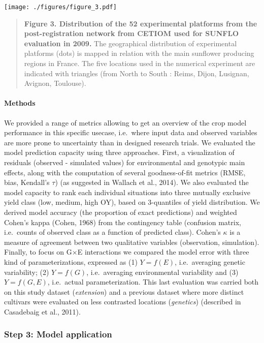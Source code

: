 \documentclass[a4paper]{article}
\let\oldparagraph\paragraph
\renewcommand{\paragraph}[1]{\oldparagraph{#1}\mbox{}}
\begin{document}
\texttt{[image: ./figures/figure\_3.pdf]}

\begin{quote}
\textbf{Figure 3. Distribution of the 52 experimental platforms from the
post-registration network from CETIOM used for SUNFLO evaluation in
2009.} The geographical distribution of experimental platforms (dots) is
mapped in relation with the main sunflower producing regions in France.
The five locations used in the numerical experiment are indicated with
triangles (from North to South : Reims, Dijon, Lusignan, Avignon,
Toulouse).
\end{quote}

\paragraph{Methods}\label{methods}

We provided a range of metrics allowing to get an overview of the crop
model performance in this specific usecase, i.e.~where input data and
observed variables are more prone to uncertainty than in designed
research trials. We evaluated the model prediction capacity using three
approaches. First, a visualization of residuals (observed - simulated
values) for environmental and genotypic main effects, along with the
computation of several goodness-of-fit metrics (RMSE, bias, Kendall's
\(\tau\)) (as suggested in Wallach et al., 2014). We also evaluated the
model capacity to rank each individual situations into three mutually
exclusive yield class (low, medium, high OY), based on 3-quantiles of
yield distribution. We derived model accuracy (the proportion of exact
predictions) and weighted Cohen's kappa (Cohen, 1968) from the
contingency table (confusion matrix, i.e.~counts of observed class as a
function of predicted class). Cohen's \(\kappa\) is a measure of
agreement between two qualitative variables (observation, simulation).
Finally, to focus on G\(\times\)E interactions we compared the model
error with three kind of parameterizations, expressed as (1)
\(Y = f(E)\), i.e.~averaging genetic variability; (2) \(Y = f(G)\),
i.e.~averaging environmental variability and (3) \(Y = f(G, E)\),
i.e.~actual parameterization. This last evaluation was carried both on
this study dataset (\emph{extension}) and a previous dataset where more
distinct cultivars were evaluated on less contrasted locations
(\emph{genetics}) (described in Casadebaig et al., 2011).

\subsubsection{Step 3: Model
application}\label{step-3-model-application}
\end{document}
